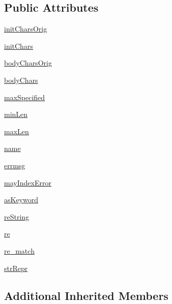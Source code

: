 \subsection*{Public Attributes}
\begin{DoxyCompactItemize}
\item 
\hyperlink{classpip_1_1__vendor_1_1pyparsing_1_1Word_a69e3d53f2b5fde120693ad8308cbb0af}{init\+Chars\+Orig}
\item 
\hyperlink{classpip_1_1__vendor_1_1pyparsing_1_1Word_af0533d25a0473bf06e194ff40946187a}{init\+Chars}
\item 
\hyperlink{classpip_1_1__vendor_1_1pyparsing_1_1Word_a1a756d52eed98bdfd97ba0ab07c3de99}{body\+Chars\+Orig}
\item 
\hyperlink{classpip_1_1__vendor_1_1pyparsing_1_1Word_af76643db9297b176316e4f4e8b34a553}{body\+Chars}
\item 
\hyperlink{classpip_1_1__vendor_1_1pyparsing_1_1Word_a48b1d0665f4419079c0fecb5dd2ced8e}{max\+Specified}
\item 
\hyperlink{classpip_1_1__vendor_1_1pyparsing_1_1Word_a66cceb696ebc8a92d7f6fabfcc9046cb}{min\+Len}
\item 
\hyperlink{classpip_1_1__vendor_1_1pyparsing_1_1Word_ae55ebb16c7a978563dd8f3196f37b550}{max\+Len}
\item 
\hyperlink{classpip_1_1__vendor_1_1pyparsing_1_1Word_ad53cf91e2d4087222fd8639ad07d0dda}{name}
\item 
\hyperlink{classpip_1_1__vendor_1_1pyparsing_1_1Word_a329f8897162cfee5cff5ddab39f9e1ab}{errmsg}
\item 
\hyperlink{classpip_1_1__vendor_1_1pyparsing_1_1Word_a8ed59d943ea79d2f1bb85f2f1451905e}{may\+Index\+Error}
\item 
\hyperlink{classpip_1_1__vendor_1_1pyparsing_1_1Word_a417fbb59497f780426040fb713ae08dc}{as\+Keyword}
\item 
\hyperlink{classpip_1_1__vendor_1_1pyparsing_1_1Word_abfe478ada5581037e21b334e59609719}{re\+String}
\item 
\hyperlink{classpip_1_1__vendor_1_1pyparsing_1_1Word_a7c914a245f5bfbc26f18e0351458fff5}{re}
\item 
\hyperlink{classpip_1_1__vendor_1_1pyparsing_1_1Word_a110a36da9587c9fe0410f8142624b358}{re\+\_\+match}
\item 
\hyperlink{classpip_1_1__vendor_1_1pyparsing_1_1Word_a2e25d976b05f6a886e8810f97ec1d04c}{str\+Repr}
\end{DoxyCompactItemize}
\subsection*{Additional Inherited Members}


